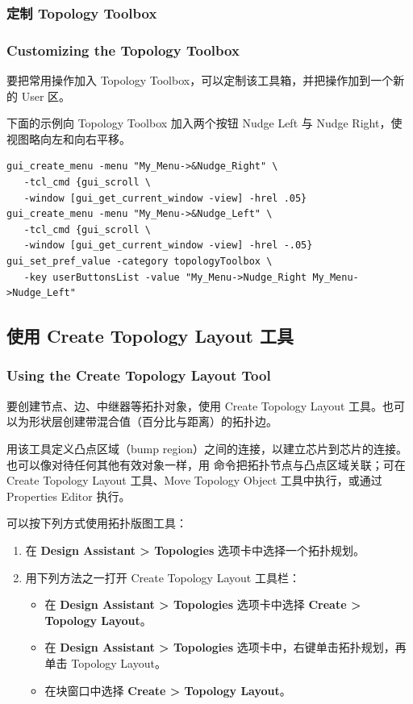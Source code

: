 \subsubsection{定制 Topology Toolbox}
\subsubsection*{Customizing the Topology Toolbox}

要把常用操作加入 Topology Toolbox，可以定制该工具箱，并把操作加到一个新的 User 区。

下面的示例向 Topology Toolbox 加入两个按钮 Nudge Left 与 Nudge Right，使视图略向左和向右平移。
\begin{lstlisting}
gui_create_menu -menu "My_Menu->&Nudge_Right" \
   -tcl_cmd {gui_scroll \
   -window [gui_get_current_window -view] -hrel .05}
gui_create_menu -menu "My_Menu->&Nudge_Left" \
   -tcl_cmd {gui_scroll \
   -window [gui_get_current_window -view] -hrel -.05}
gui_set_pref_value -category topologyToolbox \
   -key userButtonsList -value "My_Menu->Nudge_Right My_Menu->Nudge_Left"
\end{lstlisting}

\subsection{使用 Create Topology Layout 工具}
\subsubsection*{Using the Create Topology Layout Tool}

要创建节点、边、中继器等拓扑对象，使用 Create Topology Layout 工具。也可以为形状层创建带混合值（百分比与距离）的拓扑边。

用该工具定义凸点区域（bump region）之间的连接，以建立芯片到芯片的连接。也可以像对待任何其他有效对象一样，用  命令把拓扑节点与凸点区域关联；可在 Create Topology Layout 工具、Move Topology Object 工具中执行，或通过 Properties Editor 执行。

可以按下列方式使用拓扑版图工具：
\begin{enumerate}
  \item 在 \textbf{Design Assistant > Topologies} 选项卡中选择一个拓扑规划。
  \item 用下列方法之一打开 Create Topology Layout 工具栏：
  \begin{itemize}
    \item 在 \textbf{Design Assistant > Topologies} 选项卡中选择 \textbf{Create > Topology Layout}。
    \item 在 \textbf{Design Assistant > Topologies} 选项卡中，右键单击拓扑规划，再单击 Topology Layout。
    \item 在块窗口中选择 \textbf{Create > Topology Layout}。
  \end{itemize}
\end{enumerate}


